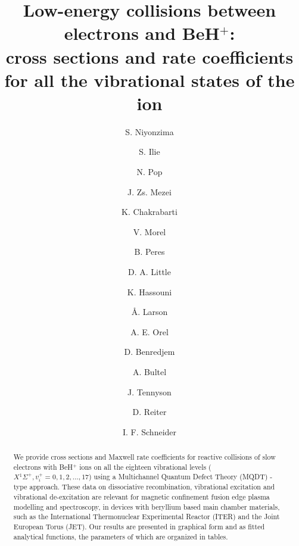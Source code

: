 \documentclass[reviewcopy]{elsarticle}
\begin{document}
\begin{frontmatter}

  \title{Low-energy collisions between electrons and BeH$^+$: \\
  cross sections and rate coefficients for all the vibrational states of the ion}

\author[1,2]{S. Niyonzima}
\author[1,3]{S. Ilie}
\author[1,3]{N. Pop}
\author[1,4,5,6]{J. Zs. Mezei}
\author[7]{K. Chakrabarti}
\author[8]{V. Morel}
\author[8]{B. Peres}
\author[9]{D. A. Little}
\author[4]{K. Hassouni}
\author[10]{\AA. Larson}
\author[11]{A. E. Orel}
\author[5]{D. Benredjem}
\author[8]{A. Bultel}
\author[9]{J. Tennyson}
\author[12]{D. Reiter}
\author[1,5]{I. F. Schneider}


\address[1]{Laboratoire Ondes et Milieux Complexes CNRS$-$Universit{\'{e}} du Havre$-$    Normandie Universit{\'{e}}, 76058 Le Havre, France}
\address[2]{D\'epartement de Physique, Facult\'e des Sciences, Universit\'e du Burundi, B.P. 2700 Bujumbura, Burundi}
\address[3]{Fundamental of Physics for Engineers Department, Politehnica University Timisoara,  300223 Timisoara, Romania}
\address[4]{Laboratoire des Sciences des Proc\'ed\'es et des Mat\'eriaux, CNRS$-$Universit\'e Paris 13$-$USPC, 93430 Villetaneuse, France}
\address[5]{Laboratoire Aim\'{e}-Cotton, CNRS$-$Universit\'e Paris-Sud$-$ENS Cachan$-$Universit\'e Paris-Saclay, 91405 Orsay, France}
\address[6]{Institute of Nuclear Research, Hungarian Academy of Sciences, Debrecen, Hungary}
\address[7]{Department of Mathematics, Scottish Church College, Calcutta 700 006, India}
\address[8]{CORIA CNRS$-$Universit\'{e} de Rouen$-$Universit{\'{e}} Normandie, F-76801 Saint-Etienne du Rouvray, France}
\address[9]{Department of Physics and Astronomy, University College London, WC1E 6BT London, UK}
\address[10]{Department of Physics, Stockholm University, AlbaNova University Center, S-106 91 Stockholm, Sweden}
\address[11]{Department of Chemical Engineering and Materials Science, University of California, Davis, California 95616, USA}
\address[12]{Institute of Energy and Climate Research-Plasma Physics, Forschungszentrum J\"ulich GmbH Association EURATOM-FZJ, Partner in Trilateral Cluster, 52425 J\"ulich, Germany}


\begin{abstract}
We provide cross sections and Maxwell rate coefficients for reactive collisions of slow electrons with BeH$^+$ ions on all the eighteen vibrational levels ($X{^{1}\Sigma^{+}},v_{i}^{+}=0,1,2,\dots,17$) using a Multichannel Quantum Defect Theory (MQDT) - type approach. These data on dissociative recombination, vibrational excitation and vibrational de-excitation are relevant for magnetic confinement fusion edge plasma modelling and spectroscopy, in devices with beryllium based main chamber materials, such as the International Thermonuclear Experimental Reactor (ITER) and the Joint European Torus (JET). Our results are presented in graphical form and as fitted analytical functions, the parameters of which are organized in tables.
\end{abstract}


\end{frontmatter}
\end{document}
